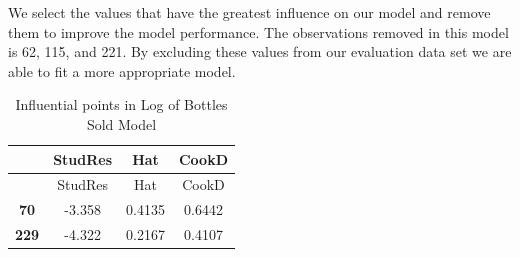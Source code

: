 \documentclass[]{elsarticle} %
\begin{document}
We select the values that have the greatest influence on our model and
remove them to improve the model performance. The observations removed
in this model is 62, 115, and 221. By excluding these values from our
evaluation data set we are able to fit a more appropriate model.

\begin{longtable}[]{@{}cccc@{}}
\caption{Influential points in Log of Bottles Sold Model}\tabularnewline
\toprule
\begin{minipage}[b]{0.12\columnwidth}\centering\strut
~\strut
\end{minipage} & \begin{minipage}[b]{0.12\columnwidth}\centering\strut
StudRes\strut
\end{minipage} & \begin{minipage}[b]{0.09\columnwidth}\centering\strut
Hat\strut
\end{minipage} & \begin{minipage}[b]{0.09\columnwidth}\centering\strut
CookD\strut
\end{minipage}\tabularnewline
\midrule
\endfirsthead
\toprule
\begin{minipage}[b]{0.12\columnwidth}\centering\strut
~\strut
\end{minipage} & \begin{minipage}[b]{0.12\columnwidth}\centering\strut
StudRes\strut
\end{minipage} & \begin{minipage}[b]{0.09\columnwidth}\centering\strut
Hat\strut
\end{minipage} & \begin{minipage}[b]{0.09\columnwidth}\centering\strut
CookD\strut
\end{minipage}\tabularnewline
\midrule
\endhead
\begin{minipage}[t]{0.12\columnwidth}\centering\strut
\textbf{70}\strut
\end{minipage} & \begin{minipage}[t]{0.12\columnwidth}\centering\strut
-3.358\strut
\end{minipage} & \begin{minipage}[t]{0.09\columnwidth}\centering\strut
0.4135\strut
\end{minipage} & \begin{minipage}[t]{0.09\columnwidth}\centering\strut
0.6442\strut
\end{minipage}\tabularnewline
\begin{minipage}[t]{0.12\columnwidth}\centering\strut
\textbf{229}\strut
\end{minipage} & \begin{minipage}[t]{0.12\columnwidth}\centering\strut
-4.322\strut
\end{minipage} & \begin{minipage}[t]{0.09\columnwidth}\centering\strut
0.2167\strut
\end{minipage} & \begin{minipage}[t]{0.09\columnwidth}\centering\strut
0.4107\strut
\end{minipage}\tabularnewline
\bottomrule
\end{longtable}
\end{document}
